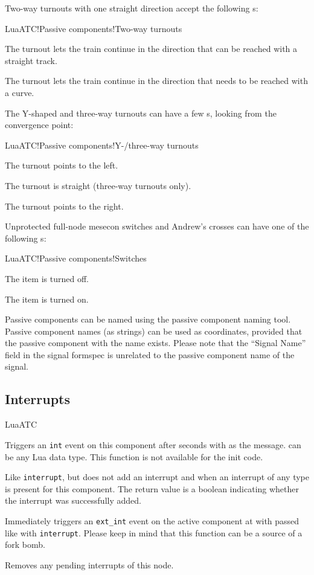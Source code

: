 Two-way turnouts with one straight direction accept the following s:
\begin{apidoc}{LuaATC!Passive components!Two-way turnouts}
\item {} The turnout lets the train continue in the direction that can be reached with a straight track.
\item {} The turnout lets the train continue in the direction that needs to be reached with a curve.
\end{apidoc}

The Y-shaped and three-way turnouts can have a few s, looking from the convergence point:
\begin{apidoc}{LuaATC!Passive components!Y-/three-way turnouts}
\item {} The turnout points to the left.
\item {} The turnout is straight (three-way turnouts only).
\item {} The turnout points to the right.
\end{apidoc}

Unprotected full-node mesecon switches and Andrew's crosses can have one of the following s:
\begin{apidoc}{LuaATC!Passive components!Switches}
\item {} The item is turned off.
\item {} The item is turned on.
\end{apidoc}

Passive components can be named using the passive component naming tool. Passive component names (as strings) can be used as coordinates, provided that the passive component with the name exists. Please note that the ``Signal Name'' field in the signal formspec is unrelated to the passive component name of the signal.

\subsection{Interrupts}
\begin{apidoc}{LuaATC}
\item {} Triggers an \texttt{int} event on this component after  seconds with  as the message.  can be any Lua data type. This function is not available for the init code.
\item {} Like \texttt{interrupt}, but does not add an interrupt and when an interrupt of any type is present for this component. The return value is a boolean indicating whether the interrupt was successfully added.
\item {} Immediately triggers an \texttt{ext\_int} event on the active component at  with  passed like with \texttt{interrupt}. Please keep in mind that this function can be a source of a fork bomb.
\item {} Removes any pending interrupts of this node.
\end{apidoc}


